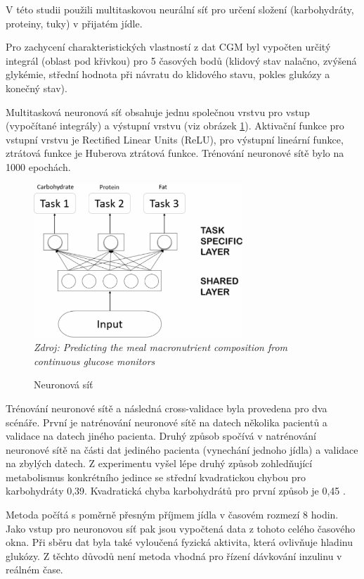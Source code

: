V této studii \citet{analyzaCHO.Neuronka} použili multitaskovou neurální síť pro určení složení (karbohydráty, proteiny, tuky) v přijatém jídle.

Pro zachycení charakteristických vlastností z dat CGM byl vypočten určitý integrál (oblast pod křivkou) pro 5 časových bodů (klidový stav nalačno, zvýšená glykémie, střední hodnota při návratu do klidového stavu, pokles glukózy a konečný stav).

Multitasková neuronová síť obsahuje jednu společnou vrstvu pro vstup (vypočítané integrály) a výstupní vrstvu (viz obrázek \ref{fig:analyza:neuronka}). Aktivační funkce pro vstupní vrstvu je Rectified Linear Units (ReLU), pro výstupní lineární funkce, ztrátová funkce je Huberova ztrátová funkce. Trénování neuronové sítě bylo na 1000 epochách.

\begin{figure}[H]
\caption{Neuronová síť}
\label{fig:analyza:neuronka}
\centering
\includegraphics[width=0.7\textwidth]{img/analyzaCHO/neuronka.png}\\
\textit{Zdroj: Predicting the meal macronutrient composition from continuous glucose monitors \citep{analyzaCHO.Neuronka}}
\end{figure}

Trénování neuronové sítě a následná cross-validace byla provedena pro dva scénáře. První je natrénování neuronové sítě na datech několika pacientů a validace na datech jiného pacienta. Druhý způsob spočívá v natrénování neuronové sítě na části dat jediného pacienta (vynechání jednoho jídla) a validace na zbylých datech. Z experimentu vyšel lépe druhý způsob zohledňující metabolismus konkrétního jedince se střední kvadratickou chybou pro karbohydráty 0,39. Kvadratická chyba karbohydrátů pro první způsob je 0,45 \citep{analyzaCHO.Neuronka}. 

Metoda počítá s poměrně přesným příjmem jídla v časovém rozmezí 8 hodin. Jako vstup pro neuronovou síť pak jsou vypočtená data z tohoto celého časového okna. Při sběru dat byla také vyloučená fyzická aktivita, která ovlivňuje hladinu glukózy. Z těchto důvodů není metoda vhodná pro řízení dávkování inzulinu v reálném čase.


